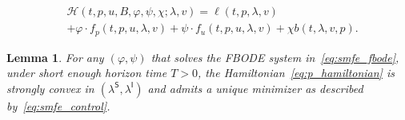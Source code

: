 \documentclass[10pt,a4paper]{amsart}
\newtheorem{lemma}{Lemma}
\def\sI{\mathsf{I}}
\def\sS{\mathsf{S}}
\begin{document}
    \begin{equation}
        \label{eq:p_hamiltonian}
        \begin{aligned}
            &\mathcal{H}(t, p, u, B, \varphi, \psi, \chi ; \lambda, v)=\ell(t, p, \lambda, v)\\ &+\varphi \cdot f_p(t, p, u, \lambda, v) +\psi \cdot f_u(t, p, u, \lambda, v)+\chi b(t, \lambda, v, p).
        \end{aligned}
    \end{equation}

\begin{lemma}
    \label{lemma:h_convexity}
    For any $(\varphi, \psi)$ that solves the FBODE system in~\eqref{eq:smfe_fbode}, under short enough horizon time $T > 0$, the Hamiltonian~\eqref{eq:p_hamiltonian} is strongly convex in $(\lambda^\sS,\lambda^\sI)$ and admits a unique minimizer as described by~\eqref{eq:smfe_control}.
\end{lemma}
\end{document}
